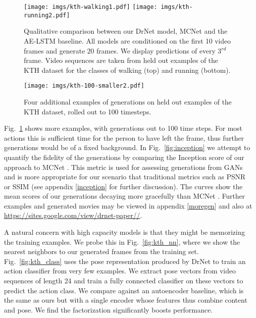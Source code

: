 \documentclass{article}
\newcommand{\fig}[1]{Fig.~\ref{fig:#1}}
\newcommand{\drnet}{{\sc DrNet} }
\begin{document}
\begin{figure}[t!]
\begin{center}
   \texttt{[image: imgs/kth-walking1.pdf]}
    \texttt{[image: imgs/kth-running2.pdf]}
\end{center}
\caption{Qualitative comparison between our \drnet model, MCNet
  \cite{Villegas17}  and the AE-LSTM baseline. All models are
  conditioned on the first 10 video frames and generate 20 frames. We
  display predictions of every 3$^{rd}$ frame. Video sequences are
  taken from held out examples of the KTH dataset for the classes of
  walking (top) and running (bottom).} 
\end{figure}\label{fig:kth-20}\begin{figure}[b!]
    \texttt{[image: imgs/kth-100-smaller2.pdf]}
\caption{Four additional examples of generations on held out examples
  of the KTH dataset, rolled out to 100 timesteps. } 
\label{fig:kth-100}
\end{figure}\fig{kth-100} shows more examples, with generations out to
100 time steps. For most actions this is sufficient time for the person to
have left the frame, thus further generations would be of a fixed
background. In \fig{inception} we attempt to quantify the fidelity
of the generations by comparing the Inception score \cite{Salimans16}
of our approach to MCNet \cite{Villegas17}. This metric is used for
assessing generations from GANs and is more appropriate for our scenario
that traditional metrics such as PSNR or SSIM (see appendix \ref{inception} 
for further discussion). The curves show the mean scores of
our generations decaying more gracefully than MCNet \cite{Villegas17}. Further examples and
generated movies may be viewed in appendix \ref{moregen} and also at \url{https://sites.google.com/view/drnet-paper//}.   


A natural concern with high capacity models is that they might be
memorizing the training examples. We probe this in \fig{kth_nn}, where
we show the nearest neighbors to our generated frames from the
training set. 
\fig{kth_class} uses the pose representation produced by
\drnet to train an action classifier from very few examples. 
We extract pose vectors from video sequences of length 24 and train a fully connected classifier on these vectors to predict the action class. 
We compare against an autoencoder baseline, which is the same as ours but with a single encoder whose features thus combine content and pose. 
We find the factorization significantly boosts performance.
\end{document}
